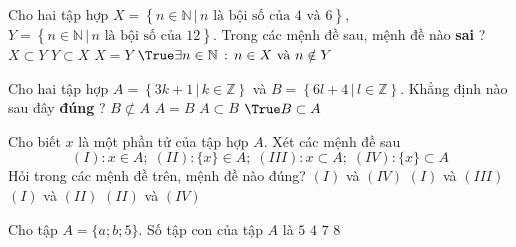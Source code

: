 \begin{ex}%
	Cho hai tập hợp $ X = \left\{n \in \mathbb{N} \,|\, n \text{ là bội số của } 4 \text{ và } 6\right\}  $, $ Y = \left\{n \in \mathbb{N} \,|\, n \text{ là bội số của } 12 \right\} $. Trong các mệnh đề sau, mệnh đề nào \textbf{sai} ?
	 \choice
		{$ X \subset Y  $}
		{$ Y \subset X $} 
		 {$ X = Y $}
		{$ \True \exists n  \in \mathbb{N} \,:\, n \in X \text{ và } n \notin Y $}
\end{ex}

\begin{ex}%
	Cho hai tập hợp $ A = \left\{ 3k+1\,|\,k \in \mathbb{Z} \right\}$ và  $ B = \left\{6l+4\,|\,l \in \mathbb{Z} \right\} $. Khẳng định nào sau đây \textbf{đúng} ?
	\choice 
		 {$ B \not\subset A $}
		{$ A = B  $}
		{$ A \subset B $} 
		{$ \True  B \subset A $}
\end{ex}

\begin{ex}%
	Cho biết $x$ là một phần tử  của tập hợp $A$. Xét các mệnh đề sau
	\[(I): x \in A; \; (II): \{x\} \in A;  \; (III): x \subset A; \; (IV): \{x\} \subset A \]
	Hỏi trong các mệnh đề trên, mệnh  đề nào đúng?
	 \choice
		{\True  $(I)$ và $(IV)$}
		 {$(I)$ và $(III)$}
		{$(I)$  và $(II)$}
		{$(II)$ và $(IV)$} 
\end{ex}

\begin{ex}%
	Cho tập $A=\{a;b;5\}$. Số tập con  của tập $A$ là
	 \choice
		{$5$} 
		{$4$} 
		 {$7$}
		{\True  $8$}
\end{ex}

